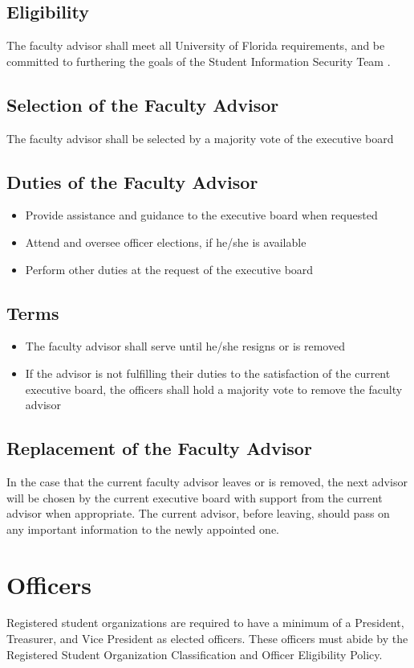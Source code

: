 \documentclass{article}
\def\clubfullname{Student Information Security Team }
\begin{document}
\subsection{Eligibility}
The faculty advisor shall meet all University of Florida requirements, and be committed to furthering the goals of the \clubfullname.

\subsection{Selection of the Faculty Advisor}
The faculty advisor shall be selected by a majority vote of the executive board

\subsection{Duties of the Faculty Advisor}
\begin{itemize}
    \item Provide assistance and guidance to the executive board when requested
    \item Attend and oversee officer elections, if he/she is available
    \item Perform other duties at the request of the executive board
\end{itemize}
\subsection{Terms}
\begin{itemize}
    \item The faculty advisor shall serve until he/she resigns or is removed
    \item If the advisor is not fulfilling their duties to the satisfaction of the current executive board, the officers shall hold a majority vote to remove the faculty advisor

\end{itemize}
\subsection{Replacement of the Faculty Advisor}
In the case that the current faculty advisor leaves or is removed, the next advisor will be chosen by the current executive board with support from the current advisor when appropriate. 
The current advisor, before leaving, should pass on any important information to the newly appointed one. 


\section{Officers}
Registered student organizations are required to have a minimum of a President, Treasurer, and Vice President as elected officers. These officers must abide by the Registered Student Organization Classification and Officer Eligibility Policy.
\end{document}
